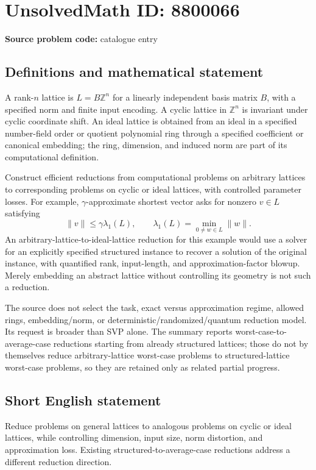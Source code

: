 \documentclass[11pt]{article}
\begin{document}
\section*{UnsolvedMath ID: 8800066}
\textbf{Source problem code:} catalogue entry
\subsection{Definitions and mathematical statement}
A rank-$n$ lattice is $L=B\mathbb Z^n$ for a linearly independent basis matrix $B$, with a specified norm and finite input encoding. A cyclic lattice in $\mathbb Z^n$ is invariant under cyclic coordinate shift. An ideal lattice is obtained from an ideal in a specified number-field order or quotient polynomial ring through a specified coefficient or canonical embedding; the ring, dimension, and induced norm are part of its computational definition.

Construct efficient reductions from computational problems on arbitrary lattices to corresponding problems on cyclic or ideal lattices, with controlled parameter losses. For example, $\gamma$-approximate shortest vector asks for nonzero $v\in L$ satisfying
\[
\|v\|\leq\gamma\lambda_1(L),\qquad
\lambda_1(L)=\min_{0\ne w\in L}\|w\|.
\]
An arbitrary-lattice-to-ideal-lattice reduction for this example would use a solver for an explicitly specified structured instance to recover a solution of the original instance, with quantified rank, input-length, and approximation-factor blowup. Merely embedding an abstract lattice without controlling its geometry is not such a reduction.

The source does not select the task, exact versus approximation regime, allowed rings, embedding/norm, or deterministic/randomized/quantum reduction model. Its request is broader than SVP alone. The summary reports worst-case-to-average-case reductions starting from already structured lattices; those do not by themselves reduce arbitrary-lattice worst-case problems to structured-lattice worst-case problems, so they are retained only as related partial progress.
\subsection{Short English statement}
Reduce problems on general lattices to analogous problems on cyclic or ideal lattices, while controlling dimension, input size, norm distortion, and approximation loss. Existing structured-to-average-case reductions address a different reduction direction.
\end{document}
